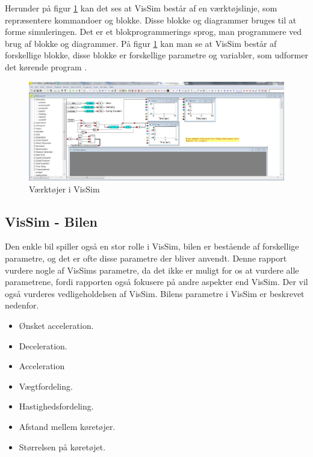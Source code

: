 \vspace{5mm}

Herunder på figur \ref{vissim} kan det ses at VisSim består af en værktøjslinje, som repræsentere kommandoer og blokke. Disse blokke og diagrammer bruges til at forme simuleringen. Det er et blokprogrammerings sprog, man programmere ved brug af blokke og diagrammer. På figur \ref{vissim} kan man se at VisSim består af forskellige blokke, disse blokke er forskellige parametre og variabler, som udformer det kørende program \cite{vissimfunker}.

\begin{figure}
\begin{center}
\includegraphics[width=1.2\textwidth]{Pictures/Teknologianalyse/vissimfunker.jpg}
\end{center}
\caption{Værktøjer i VisSim}
\label{vissim}
\end{figure}

\subsection{VisSim - Bilen}
Den enkle bil spiller også en stor rolle i VisSim, bilen er bestående af forskellige parametre, og det er ofte disse parametre der bliver anvendt. Denne rapport vurdere nogle af VisSims parametre, da det ikke er muligt for os at vurdere alle parametrene, fordi rapporten også fokusere på andre aspekter end VisSim. Der vil også vurderes vedligeholdelsen af VisSim. Bilens parametre i VisSim er beskrevet nedenfor.\cite{TrafiksimuleringVisSim}

\begin{itemize}
\item Ønsket acceleration.
\item Deceleration.
\item Acceleration
\item Vægtfordeling.
\item Hastighedsfordeling.
\item Afstand mellem køretøjer.
\item Størrelsen på køretøjet.
\end{itemize}

